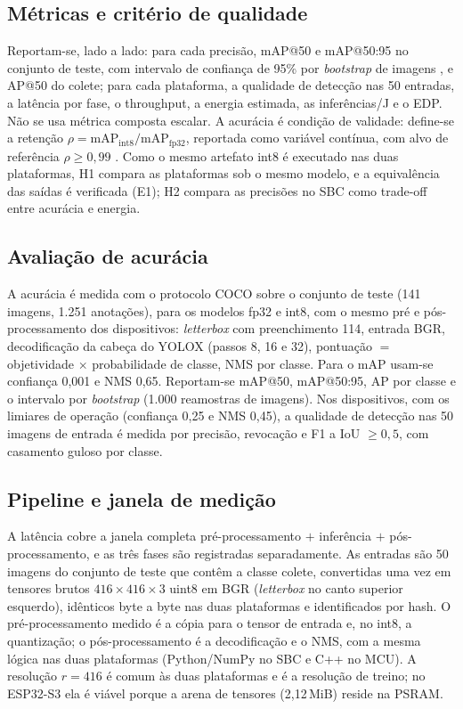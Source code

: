 \documentclass[11pt,a4paper]{article}
\begin{document}
\subsection{Métricas e critério de qualidade}\label{sec:metricas}
Reportam-se, lado a lado: para cada precisão, mAP@50 e mAP@50:95 no conjunto de teste, com intervalo de
confiança de 95\% por \emph{bootstrap} de imagens \cite{efron1993bootstrap}, e AP@50 do colete; para cada
plataforma, a qualidade de detecção nas 50 entradas, a latência por fase, o throughput, a energia estimada, as
inferências/J e o EDP. Não se usa métrica composta escalar. A acurácia é condição de validade: define-se a retenção
$\rho = \mathrm{mAP}_{\mathrm{int8}}/\mathrm{mAP}_{\mathrm{fp32}}$, reportada como variável contínua, com
alvo de referência $\rho \geq 0{,}99$ \cite{reddi2020mlperf}. Como o mesmo artefato int8 é executado nas duas
plataformas, H1 compara as plataformas sob o mesmo modelo, e a equivalência das saídas é verificada (E1); H2
compara as precisões no SBC como trade-off entre acurácia e energia.

\subsection{Avaliação de acurácia}\label{sec:e0}
A acurácia é medida com o protocolo COCO sobre o conjunto de teste (141 imagens, 1.251 anotações), para os
modelos fp32 e int8, com o mesmo pré e pós-processamento dos dispositivos: \emph{letterbox} com
preenchimento 114, entrada BGR, decodificação da cabeça do YOLOX (passos 8, 16 e 32), pontuação
$=$ objetividade $\times$ probabilidade de classe, NMS por classe. Para o mAP usam-se confiança 0,001 e NMS
0,65. Reportam-se mAP@50, mAP@50:95, AP por classe e o intervalo por \emph{bootstrap} (1.000 reamostras de
imagens). Nos dispositivos, com os limiares de operação (confiança 0,25 e NMS 0,45), a qualidade de detecção
nas 50 imagens de entrada é medida por precisão, revocação e F1 a IoU $\geq 0{,}5$, com casamento guloso por
classe.

\subsection{Pipeline e janela de medição}
A latência cobre a janela completa pré-processamento $+$ inferência $+$ pós-processamento, e as três fases
são registradas separadamente. As entradas são 50 imagens do conjunto de teste que contêm a classe colete,
convertidas uma vez em tensores brutos $416\times416\times3$ uint8 em BGR (\emph{letterbox} no canto superior
esquerdo), idênticos byte a byte nas duas plataformas e identificados por hash. O pré-processamento medido é a
cópia para o tensor de entrada e, no int8, a quantização; o pós-processamento é a decodificação e o NMS, com a mesma lógica
nas duas plataformas (Python/NumPy no SBC e C++ no MCU). A resolução $r=416$ é comum às duas plataformas e é a
resolução de treino; no ESP32-S3 ela é viável porque a arena de tensores (2,12\,MiB) reside na PSRAM.
\end{document}
